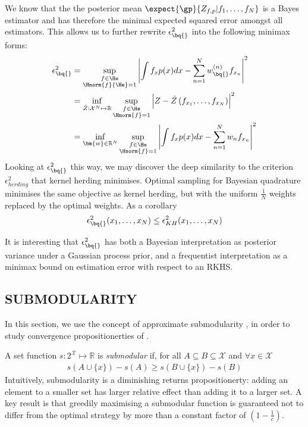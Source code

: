 We know that the the posterior mean $\expect{\gp}{Z_{f,p}\vert f_1,\ldots,f_N}$ is a Bayes estimator and has therefore the minimal expected squared error amongst all estimators. This allows us to further rewrite $\epsilon^{2}_{\bq{}}$ into the following minimax forms:
%
\begin{align}
\epsilon^{2}_{\bq{}} &= \sup_{\substack{f\in\He\\\Hnorm{f}{\He}=1}} \left| \int f_x p(x) dx - \sum_{n=1}^{N}w^{(n)}_{\bq{}} f_{x_n}\right|^2\\
	&= \inf_{\hat{Z}:\mathcal{X}^N\mapsto\mathbb{R}} \sup_{\substack{f\in\He\\\Hnorm{f}=1}} \left| Z - \hat{Z}\left(f_{x_1},\ldots,f_{x_N}\right)\right|^2\\
	&= \inf_{\bm{w}\in\mathbb{R}^N} \sup_{\substack{f\in\He\\\Hnorm{f}=1}} \left| \int f_x p(x) dx - \sum_{n=1}^{N}w_n  f_{x_n}\right|^2
\end{align}
%
Looking at $\epsilon^{2}_{\bq{}}$  this way, we may discover the deep similarity to the criterion $\epsilon^2_{herding}$ that kernel herding minimises. Optimal sampling for Bayesian quadrature minimises the same objective as kernel herding, but with the uniform $\frac{1}{N}$ weights replaced by the optimal weights. As a corollary
%
\begin{align}
	\epsilon^{2}_{\bq{}}(x_1,\ldots,x_N)  \leq \epsilon^{2}_{KH} (x_1,\ldots,x_N)
\end{align}

It is interesting that $\epsilon^{2}_{\bq{}}$ has both a Bayesian interpretation as posterior variance under a Gaussian process prior, and a frequentist interpretation as a minimax bound on estimation error with respect to an RKHS.

\subsection{SUBMODULARITY}

\label{sec:submodularity}

In this section, we use the concept of approximate submodularity \citep{KrauseCevher10}, in order to study convergence propositionerties of \sbq{}.

A set function $s:2^\mathcal{X} \mapsto \mathbb{R}$ is \textit{submodular} if, for all $A\subseteq B\subseteq \mathcal{X}$ and $\forall x \in \mathcal{X}$
%
\begin{align}
s(A\cup\{x\})-s(A)\geq s(B\cup\{x\})-s(B)
\end{align}
%
Intuitively, submodularity is a diminishing returns propositionerty: adding an element to a smaller set has larger relative effect than adding it to a larger set. A key result \cite[see e.\,g.\ ][and references therein]{KrauseCevher10} is that greedily maximising a submodular function is guaranteed not to differ from the optimal strategy by more than a constant factor of $(1-\frac{1}{e})$.

